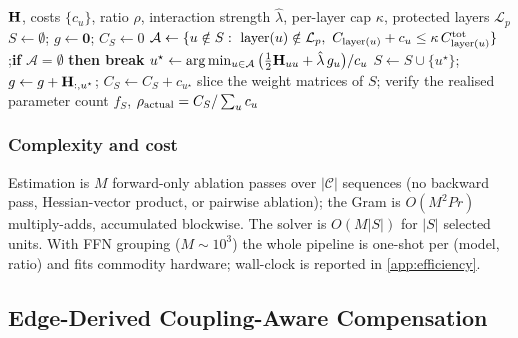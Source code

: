 \begin{algorithm}[t]
\caption{One-shot cost-normalised greedy co-pruning}
\label{alg:solve}
\begin{algorithmic}[1]
\REQUIRE $\mathbf{H}$, costs $\{c_u\}$, ratio $\rho$, interaction strength $\hat\lambda$, per-layer cap $\kappa$, protected layers $\mathcal{L}_p$
\STATE $S\leftarrow\emptyset$;\; $g\leftarrow\mathbf{0}$;\; $C_S\leftarrow 0$
  \STATE $\mathcal{A}\leftarrow\{u\notin S:\ \mathrm{layer}(u)\notin\mathcal{L}_p,\ C_{\mathrm{layer}(u)}+c_u\le\kappa\,C^{\rm tot}_{\mathrm{layer}(u)}\}$;\quad \textbf{if} $\mathcal{A}=\emptyset$ \textbf{then break}
  \STATE $u^\star\leftarrow\arg\min_{u\in\mathcal{A}}\big(\tfrac12\mathbf{H}_{uu}+\hat\lambda\,g_u\big)/c_u$
  \STATE $S\leftarrow S\cup\{u^\star\}$;\; $g\leftarrow g+\mathbf{H}_{:,u^\star}$;\; $C_S\leftarrow C_S+c_{u^\star}$
\ENDWHILE
\STATE slice the weight matrices of $S$; verify the realised parameter count
\RETURN $f_S$, $\rho_{\rm actual}=C_S/\sum_u c_u$
\end{algorithmic}
\end{algorithm}

\subsubsection{Complexity and cost}
\label{app:complexity}
Estimation is $M$ forward-only ablation passes over $|\mathcal{C}|$ sequences (no backward pass,
Hessian-vector product, or pairwise ablation); the Gram is $O(M^2 P r)$ multiply-adds, accumulated
blockwise. The solver is $O(M|S|)$ for $|S|$ selected units. With FFN grouping ($M\!\sim\!10^3$) the whole
pipeline is one-shot per (model, ratio) and fits commodity hardware; wall-clock is reported in
\cref{app:efficiency}.

\clearpage

\subsection{Edge-Derived Coupling-Aware Compensation}
\label{app:comp}

